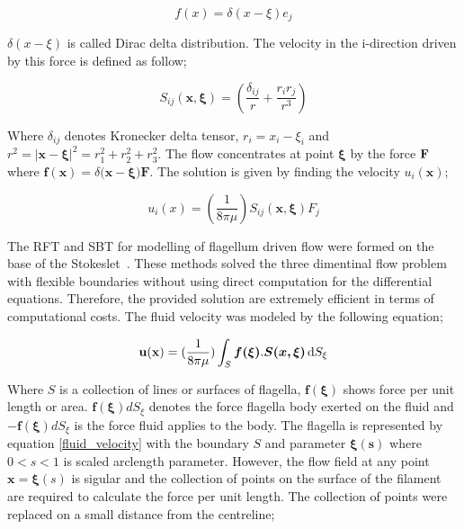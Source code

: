 \documentclass[12pt,a4paper,titlepage]{report}
\begin{document}
\begin{equation}
 f (x) = \delta (x - \xi) e_j 
\label{force}
\end{equation}

$\delta (x - \xi)$ is called Dirac delta distribution. The velocity in the i-direction driven by this force is defined
 as follow;


\begin{equation}
 S _{ij} \bm{(x , \xi)} = (\frac{\delta _{ij}}{r} + \frac{r_i r_j}{r^3})
\label{i-direction}
\end{equation}

Where $\delta _{ij}$ denotes Kronecker delta tensor, $r_i = x_i - \xi _i$ and $r^2 =| \bm{x}- \bm{\xi} |^2 = r_1 ^2 + r_2 ^ 2 + r_3 ^2$.
The flow concentrates at point $\bm \xi$ by the force $\bold F$ where $ \bm{f (x)} = \delta (\bm{x} - \bm{\xi) F}$.
The solution is given by finding the velocity $u_i(\bm x)$;

\begin{equation}
 u_i(x) =(\frac{1}{8 \pi \mu}) S_{ij}\bm{( x, \xi)} F_j
\label{velocity}
\end{equation}

The \ac*{RFT} and  \ac*{SBT} for modelling of flagellum driven 
flow were formed on the base of the Stokeslet~\citep{smith2009boundary}. These methods solved the 
three dimentinal flow problem with flexible boundaries without using direct computation for the differential
equations. Therefore, the provided solution are extremely efficient in terms of computational costs. The fluid
velocity was modeled by the following equation;
   


\begin{equation}
\bold {u(x)} =(\frac{1}{8 \pi \mu}) \int_S \mathrm \bm{f(\xi)} . \bm{S( x, \xi)}\, \mathrm{d}S_{\xi}
\label{fluid_velocity}
\end{equation}

Where $S$ is a collection of lines or surfaces of flagella, $\bm{f(\xi)}$ shows force per unit length or area.
$\bm{f(\xi)} dS_{\xi}$ denotes the force flagella body exerted on the fluid and $-\bm{f(\xi)} dS_{\xi}$ is the 
force fluid applies to the body. The flagella is represented by equation \ref{fluid_velocity} with the boundary
$S$ and parameter $\bm{\xi (s)}$ where $0 < s <1$ is scaled arclength parameter. However, the flow field
at any point $\bm{x} = \bm{\xi} (s)$ is sigular and the collection of points on the surface of the filament 
are required to calculate the force per unit length. The collection of points were replaced on a small distance 
from the centreline;
\end{document}
